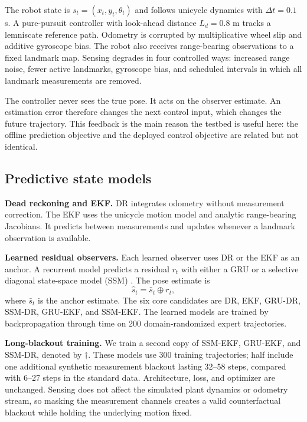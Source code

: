 \documentclass{article}
\begin{document}
The robot state is $s_t=(x_t,y_t,\theta_t)$ and follows unicycle dynamics with $\Delta t=0.1$ s. A pure-pursuit controller with look-ahead distance $L_d=0.8$ m tracks a lemniscate reference path. Odometry is corrupted by multiplicative wheel slip and additive gyroscope bias. The robot also receives range-bearing observations to a fixed landmark map. Sensing degrades in four controlled ways: increased range noise, fewer active landmarks, gyroscope bias, and scheduled intervals in which all landmark measurements are removed.

The controller never sees the true pose. It acts on the observer estimate. An estimation error therefore changes the next control input, which changes the future trajectory. This feedback is the main reason the testbed is useful here: the offline prediction objective and the deployed control objective are related but not identical.

\subsection{Predictive state models}

\textbf{Dead reckoning and EKF.} DR integrates odometry without measurement correction. The EKF uses the unicycle motion model and analytic range-bearing Jacobians. It predicts between measurements and updates whenever a landmark observation is available.

\textbf{Learned residual observers.} Each learned observer uses DR or the EKF as an anchor. A recurrent model predicts a residual $r_t$ with either a GRU or a selective diagonal state-space model (SSM) \citep{gu2022s4,gu2024mamba}. The pose estimate is
\[
    \hat{s}_t = \bar{s}_t \oplus r_t,
\]
where $\bar{s}_t$ is the anchor estimate. The six core candidates are DR, EKF, GRU-DR, SSM-DR, GRU-EKF, and SSM-EKF. The learned models are trained by backpropagation through time on 200 domain-randomized expert trajectories.

\textbf{Long-blackout training.} We train a second copy of SSM-EKF, GRU-EKF, and SSM-DR, denoted by $\dagger$. These models use 300 training trajectories; half include one additional synthetic measurement blackout lasting 32--58 steps, compared with 6--27 steps in the standard data. Architecture, loss, and optimizer are unchanged. Sensing does not affect the simulated plant dynamics or odometry stream, so masking the measurement channels creates a valid counterfactual blackout while holding the underlying motion fixed.
\end{document}
